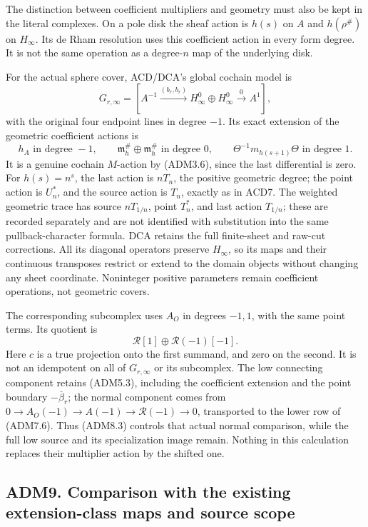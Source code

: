The distinction between coefficient multipliers and geometry must also
be kept in the literal complexes. On a pole disk the sheaf action is
\(h(s)\) on \(A\) and \(h(\rho^\#)\) on \(H_\infty\). Its de Rham
resolution uses this coefficient action in every form degree. It is not
the same operation as a degree-\(n\) map of the underlying disk.

For the actual sphere cover, ACD/DCA's global cochain model is \[
G_{r,\infty}=
[A^{-1}\xrightarrow{(b_r,b_r)}
H_\infty^0\oplus H_\infty^0\xrightarrow0 A^1],
\tag{ADM8.4}
\] with the original four endpoint lines in degree \(-1\). Its exact
extension of the geometric coefficient actions is \[
h_A\text{ in degree }-1,\qquad
\mathfrak m_h^\#\oplus\mathfrak m_h^\#\text{ in degree }0,\qquad
\Theta^{-1}m_{h(s+1)}\Theta\text{ in degree }1.
\tag{ADM8.5}
\] It is a genuine cochain \(M\)-action by (ADM3.6), since the last
differential is zero. For \(h(s)=n^s\), the last action is \(nT_n\), the
positive geometric degree; the point action is \(U_n^*\), and the source
action is \(T_n\), exactly as in ACD7. The weighted geometric trace has
source \(nT_{1/n}\), point \(T_n^*\), and last action \(T_{1/n}\); these
are recorded separately and are not identified with substitution into
the same pullback-character formula. DCA retains the full finite-sheet
and raw-cut corrections. All its diagonal operators preserve
\(H_\infty\), so its maps and their continuous transposes restrict or
extend to the domain objects without changing any sheet coordinate.
Noninteger positive parameters remain coefficient operations, not
geometric covers.

The corresponding subcomplex uses \(A_O\) in degrees \(-1,1\), with the
same point terms. Its quotient is \[
\mathcal R[1]\oplus\mathcal R(-1)[-1].
\tag{ADM8.6}
\] Here \(c\) is a true projection onto the first summand, and zero on
the second. It is not an idempotent on all of \(G_{r,\infty}\) or its
subcomplex. The low connecting component retains (ADM5.3), including the
coefficient extension and the point boundary \(-\overline\beta_r\); the
normal component comes from
\(0\to A_O(-1)\to A(-1)\to\mathcal R(-1)\to0\), transported to the lower
row of (ADM7.6). Thus (ADM8.3) controls that actual normal comparison,
while the full low source and its specialization image remain. Nothing
in this calculation replaces their multiplier action by the shifted one.

\subsection{ADM9. Comparison with the existing extension-class maps and
source
scope}\label{adm9.-comparison-with-the-existing-extension-class-maps-and-source-scope}

